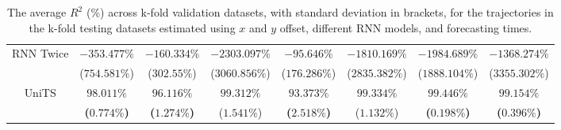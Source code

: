 \begin{table}[!ht]
{\begin{tabular}{|c|c|c|c|c|c|c|c|}
			\multirow{2}{*}{RNN Twice} & $-353.477\%$ & $-160.334\%$ & $-2303.097\%$ & $-95.646\%$ & $-1810.169\%$ & $-1984.689\%$ & $-1368.274\%$ \\
			 & ($754.581\%$) & ($302.55\%$) & ($3060.856\%$) & ($176.286\%$) & ($2835.382\%$) & ($1888.104\%$) & ($3355.302\%$) \\ \hline
			\multirow{2}{*}{UniTS} & $\mathbf{98.011\%}$ & $\mathbf{96.116\%}$ & $99.312\%$ & $\mathbf{93.373\%}$ & $99.334\%$ & $\mathbf{99.446\%}$ & $\mathbf{99.154\%}$ \\
			 & \textbf{(}$\mathbf{0.774\%}$\textbf{)} & \textbf{(}$\mathbf{1.274\%}$\textbf{)} & ($1.541\%$) & \textbf{(}$\mathbf{2.518\%}$\textbf{)} & ($1.132\%$) & \textbf{(}$\mathbf{0.198\%}$\textbf{)} & \textbf{(}$\mathbf{0.396\%}$\textbf{)} \\ \hline
		\end{tabular}
	}
	\caption{The average $R^{2}$ (\%) across k-fold validation datasets, with standard deviation in brackets, for the trajectories in the k-fold testing datasets estimated using $x$ and $y$ offset, different RNN models, and forecasting times.}
	\label{tab:all_no_abs_R2}
\end{table}

